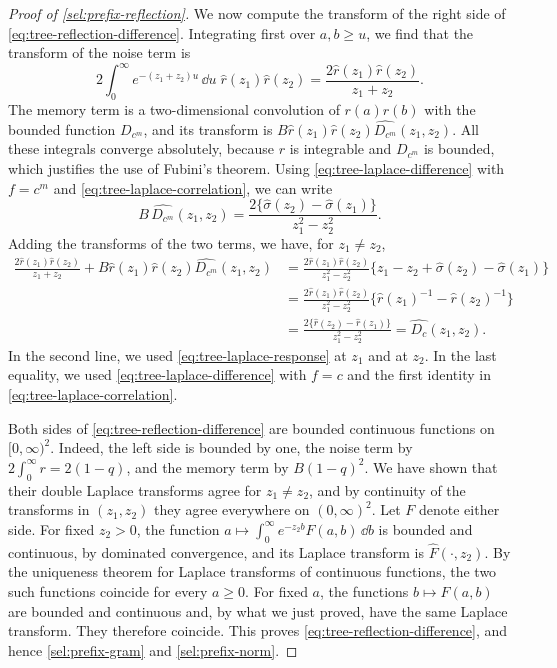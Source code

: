\begin{proof}[Proof of \cref{sel:prefix-reflection}]
We now compute the transform of the right side of \eqref{eq:tree-reflection-difference}. Integrating first over $a,b\ge u$, we find that the transform of the noise term is
\[
 2\int_0^\infty e^{-(z_1+z_2)u}\,\dd u\;\widehat r(z_1)\widehat r(z_2)=\frac{2\widehat r(z_1)\widehat r(z_2)}{z_1+z_2}.
\]
The memory term is a two-dimensional convolution of $r(a)r(b)$ with the bounded function $D_{c^m}$, and its transform is $B\widehat r(z_1)\widehat r(z_2)\widehat{D_{c^m}}(z_1,z_2)$. All these integrals converge absolutely, because $r$ is integrable and $D_{c^m}$ is bounded, which justifies the use of Fubini's theorem. Using \eqref{eq:tree-laplace-difference} with $f=c^m$ and \eqref{eq:tree-laplace-correlation}, we can write
\[
 B\,\widehat{D_{c^m}}(z_1,z_2)=\frac{2\{\widehat\sigma(z_2)-\widehat\sigma(z_1)\}}{z_1^2-z_2^2}.
\]
Adding the transforms of the two terms, we have, for $z_1\ne z_2$,
\begin{align*}
 \frac{2\widehat r(z_1)\widehat r(z_2)}{z_1+z_2}
 +B\widehat r(z_1)\widehat r(z_2)\widehat{D_{c^m}}(z_1,z_2)
 &=\frac{2\widehat r(z_1)\widehat r(z_2)}{z_1^2-z_2^2}\bigl\{z_1-z_2+\widehat\sigma(z_2)-\widehat\sigma(z_1)\bigr\}\\
 &=\frac{2\widehat r(z_1)\widehat r(z_2)}{z_1^2-z_2^2}\bigl\{\widehat r(z_1)^{-1}-\widehat r(z_2)^{-1}\bigr\}\\
 &=\frac{2\{\widehat r(z_2)-\widehat r(z_1)\}}{z_1^2-z_2^2}
 =\widehat{D_c}(z_1,z_2).
\end{align*}
In the second line, we used \eqref{eq:tree-laplace-response} at $z_1$ and at $z_2$. In the last equality, we used \eqref{eq:tree-laplace-difference} with $f=c$ and the first identity in \eqref{eq:tree-laplace-correlation}.

Both sides of \eqref{eq:tree-reflection-difference} are bounded continuous functions on $[0,\infty)^2$. Indeed, the left side is bounded by one, the noise term by $2\int_0^\infty r=2(1-q)$, and the memory term by $B(1-q)^2$. We have shown that their double Laplace transforms agree for $z_1\ne z_2$, and by continuity of the transforms in $(z_1,z_2)$ they agree everywhere on $(0,\infty)^2$. Let $F$ denote either side. For fixed $z_2>0$, the function $a\mapsto\int_0^\infty e^{-z_2b}F(a,b)\,\dd b$ is bounded and continuous, by dominated convergence, and its Laplace transform is $\widehat F(\cdot,z_2)$. By the uniqueness theorem for Laplace transforms of continuous functions, the two such functions coincide for every $a\ge0$. For fixed $a$, the functions $b\mapsto F(a,b)$ are bounded and continuous and, by what we just proved, have the same Laplace transform. They therefore coincide. This proves \eqref{eq:tree-reflection-difference}, and hence \eqref{sel:prefix-gram} and \eqref{sel:prefix-norm}.


\end{proof}
